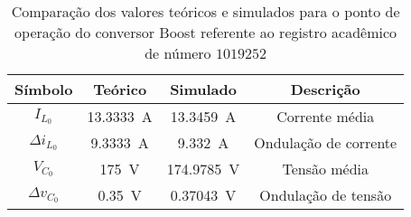 \begin{table}[!ht]
\centering
\caption{Comparação dos valores teóricos e simulados para o ponto de operação do conversor Boost referente ao registro acadêmico de número $1019252$}
\label{tab:steadystatesim}
\begin{tabular}{@{}cccc@{}}
\toprule
\textbf{Símbolo} & \textbf{Teórico} & \textbf{Simulado} & \textbf{Descrição}\\ \midrule
$I_{L_0}$ & \SI{13.3333}{\A} & \SI{13.3459}{\A} & Corrente média\\
$\Delta{i_{L_0}}$  & \SI{9.3333}{\A} & \SI{9.332}{\A}& Ondulação de corrente\\
$V_{C_0}$ & \SI{175}{\V} & \SI{174.9785}{\V} & Tensão média\\
$\Delta{v_{C_0}}$  & \SI{0.35}{\V} & \SI{0.37043}{\V}& Ondulação de tensão \\
\bottomrule
\end{tabular}
\end{table}

